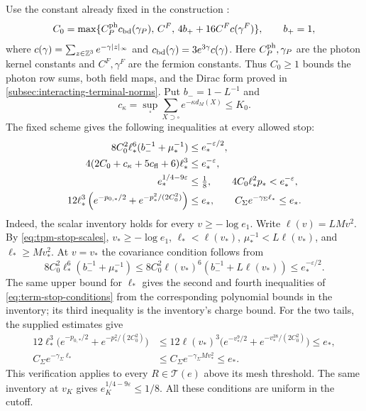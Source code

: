 Use the constant already fixed in the construction
\cite[(25)]{QED3Integration}:
\[
 C_0=\max\{C_P^{\rm ph}c_{\rm bd}(\gamma_P),\,
               C^F,\,4b_++16C^Fc(\gamma^F)\},\qquad b_+=1,
\]
where $c(\gamma)=\sum_{z\in\mathbb Z^3}e^{-\gamma|z|_\infty}$ and
$c_{\rm bd}(\gamma)=3e^{3\gamma}c(\gamma)$.
Here $C_P^{\rm ph},\gamma_P$ are the photon kernel constants
and $C^F,\gamma^F$ are the fermion constants. Thus $C_0\ge1$
bounds the photon row sums, both field maps, and the Dirac form
proved in \cref{subsec:interacting-terminal-norms}.
Put $b_-=1-L^{-1}$ and
\[
 c_\kappa=\sup_\square\sum_{X\supset\square}
                                      e^{-\kappa d_M(X)}\le K_0.
\]
The fixed scheme gives the following inequalities at every
allowed stop:
\begin{align}
 8C_0^2\ell_*^6(b_-^{-1}+\mu_*^{-1})
                   &\le e_*^{-\varepsilon/2},\nonumber\\
 4(2C_0+c_\kappa+5c_{\rm fl}+6)\ell_*^3
                   &\le e_*^{-\varepsilon},\nonumber\\
 e_*^{1/4-9\varepsilon}&\le\tfrac18,\qquad
 4C_0\ell_*^2p_*<e_*^{-\varepsilon},\nonumber\\
 12\ell_*^3\left(e^{-p_{0,*}/2}
                         +e^{-p_*^2/(2C_0^2)}\right)&\le e_*,
 \qquad
 C_\Sigma e^{-\gamma_\Sigma\ell_*}\le e_*.
                                      \label{eq:term-stop-conditions}
\end{align}
Indeed, the scalar inventory \cite[(29)]{QED3Integration}
holds for every $v\ge-\log e_1$. Write $\ell(v)=LMv^2$.
By \eqref{eq:tpm-stop-scales}, $v_*\ge-\log e_1$,
$\ell_*<\ell(v_*)$, $\mu_*^{-1}<L\ell(v_*)$, and
$\ell_*\ge Mv_*^2$. At $v=v_*$ the covariance condition follows from
\[
 8C_0^2\ell_*^6(b_-^{-1}+\mu_*^{-1})
 \le8C_0^2\ell(v_*)^6(b_-^{-1}+L\ell(v_*))
 \le e_*^{-\varepsilon/2}.
\]
The same upper bound for $\ell_*$ gives the second and fourth
inequalities of \eqref{eq:term-stop-conditions} from the
corresponding polynomial bounds in the inventory; its third
inequality is the inventory's charge bound. For the two tails,
the supplied estimates give
\begin{align*}
12\ell_*^3\big(e^{-p_{0,*}/2}+e^{-p_*^2/(2C_0^2)}\big)
 &\le12\ell(v_*)^3
       \big(e^{-v_*^9/2}+e^{-v_*^{38}/(2C_0^2)}\big)\le e_*,
\\
C_\Sigma e^{-\gamma_\Sigma\ell_*}
 &\le C_\Sigma e^{-\gamma_\Sigma Mv_*^2}\le e_*.
\end{align*}
This verification applies to every $R\in\mathcal T(e)$ above
its mesh threshold. The same inventory at $v_K$ gives
$e_K^{1/4-9\varepsilon}\le1/8$. All these conditions are
uniform in the cutoff.

